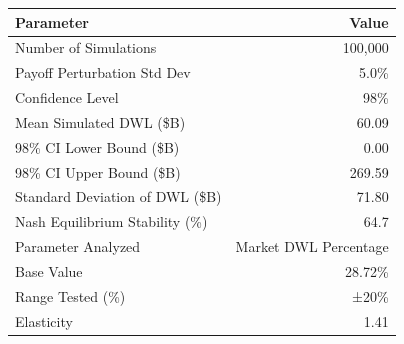 

\begin{tabular}{@{}lr@{}}
\toprule
Parameter & Value \\
\midrule
Number of Simulations & 100,000 \\
Payoff Perturbation Std Dev & 5.0\% \\
Confidence Level & 98\% \\
Mean Simulated DWL (\$B) & 60.09 \\
98\% CI Lower Bound (\$B) & 0.00 \\
98\% CI Upper Bound (\$B) & 269.59 \\
Standard Deviation of DWL (\$B) & 71.80 \\
Nash Equilibrium Stability (\%) & 64.7 \\
Parameter Analyzed & Market DWL Percentage \\
Base Value & 28.72\% \\
Range Tested (\%) & ±20\% \\
Elasticity & 1.41 \\
\bottomrule
\end{tabular}